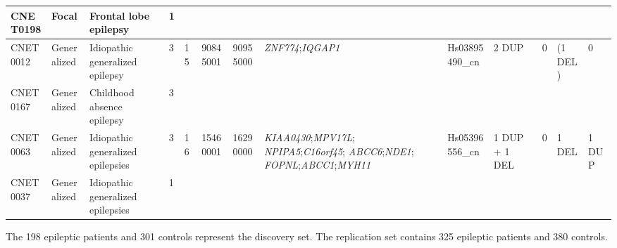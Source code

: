 \begin{table}[!ht]
{\begin{tabular}{|l|l|p{}|l|l|l|l|p{}|l|l|l|l|l|}
      CNET0198                        & Focal                                & Frontal lobe epilepsy                  & 1            &                              &                                   &                                &                                                                &                                      &                                      &                        &                          &                        \\
      \hline
      CNET0012                        & Generalized                          & Idiopathic generalized epilepsy        & 3            & \multirow{2}{*}{15}          & \multirow{2}{*}{90845001}         & \multirow{2}{*}{90955000}      & \multirow{2}{*}{{\it ZNF774};{\it IQGAP1}}                                 & \multirow{2}{*}{Hs03895490\_cn}      & \multirow{2}{*}{2 DUP}               & \multirow{2}{*}{0}     & \multirow{2}{*}{(1 DEL)} & \multirow{2}{*}{0}     \\
      CNET0167                        & Generalized                          & Childhood absence epilepsy             & 3            &                              &                                   &                                &                                                                &                                      &                                      &                        &                          &                        \\
      \hline
      CNET0063                        & Generalized                          & Idiopathic generalized epilepsies      & 3            & \multirow{2}{*}{16}          & \multirow{2}{*}{15460001}         & \multirow{2}{*}{16290000}      & {\it KIAA0430};{\it MPV17L}; {\it NPIPA5};{\it C16orf45}; {\it ABCC6};{\it NDE1}; {\it FOPNL};{\it ABCC1};{\it MYH11} & \multirow{2}{*}{Hs05396556\_cn}      & \multirow{2}{*}{1 DUP + 1 DEL}       & \multirow{2}{*}{0}     & \multirow{2}{*}{1 DEL}   & \multirow{2}{*}{1 DUP} \\
      CNET0037                        & Generalized                          & Idiopathic generalized epilepsies      & 1            &                              &                                   &                                &                                                                &                                      &                                      &                        &                          &                        \\
      \hline
    \end{tabular}
  }
  \begin{flushleft}
    The 198 epileptic patients and 301 controls represent the discovery set. The replication set contains 325 epileptic patients and 380 controls.
  \end{flushleft}
  \label{tab:2}
\end{table}


